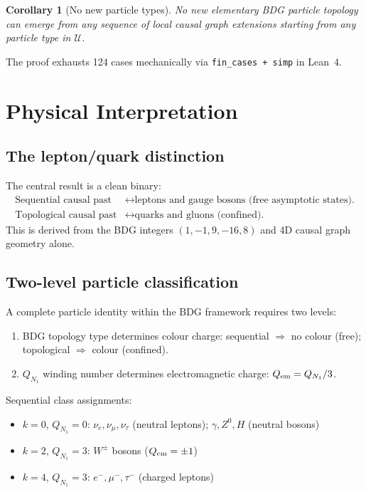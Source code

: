 \documentclass[11pt,a4paper]{article}
\newtheorem{corollary}[theorem]{Corollary}
\begin{document}
\begin{corollary}[No new particle types]
No new elementary BDG particle topology can emerge from any sequence of local causal graph extensions starting from any particle type in $\mathcal{U}$.
\end{corollary}

The proof exhausts 124 cases mechanically via \texttt{fin\_cases + simp} in Lean~4.

\section{Physical Interpretation}
\label{sec:phys}

\subsection{The lepton/quark distinction}

The central result is a clean binary:
\begin{align*}
\text{Sequential causal past} &\longleftrightarrow \text{leptons and gauge bosons (free asymptotic states).}\\
\text{Topological causal past} &\longleftrightarrow \text{quarks and gluons (confined).}
\end{align*}
This is derived from the BDG integers $(1,-1,9,-16,8)$ and 4D causal graph geometry alone.

\subsection{Two-level particle classification}

A complete particle identity within the BDG framework requires two levels:
\begin{enumerate}
\item BDG topology type determines colour charge: sequential $\Rightarrow$ no colour (free); topological $\Rightarrow$ colour (confined).
\item $Q_{N_1}$ winding number determines electromagnetic charge: $Q_{\rm em} = Q_{N_1}/3$.
\end{enumerate}

Sequential class assignments:
\begin{itemize}
\item $k=0$, $Q_{N_1}=0$: $\nu_e,\nu_\mu,\nu_\tau$ (neutral leptons); $\gamma,Z^0,H$ (neutral bosons)
\item $k=2$, $Q_{N_1}=3$: $W^\pm$ bosons ($Q_{\rm em}=\pm1$)
\item $k=4$, $Q_{N_1}=3$: $e^-,\mu^-,\tau^-$ (charged leptons)
\end{itemize}
\end{document}
